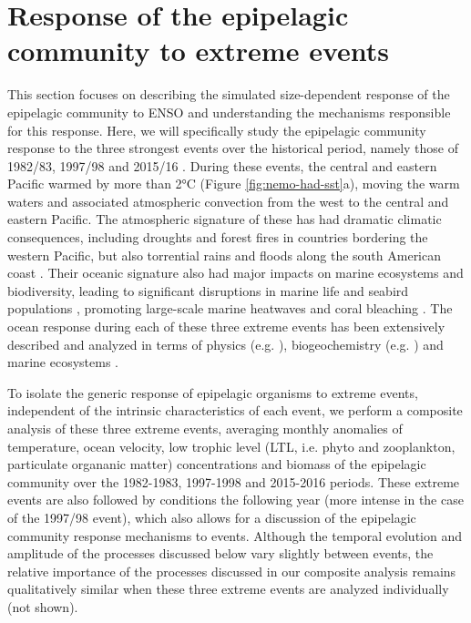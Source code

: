 
\section{Response of the epipelagic community to extreme \nino{} events}
\label{sec:nino-epi}

This section focuses on describing the simulated size-dependent response of the epipelagic community to ENSO and understanding the mechanisms responsible for this response. Here, we will specifically study the epipelagic community response to the three strongest \nino{} events over the historical period, namely those of 1982/83, 1997/98 and 2015/16 \citep{santosoDefiningCharacteristicsENSO2017}. During these events, the central and eastern Pacific warmed by more than 2°C (Figure \ref{fig:nemo-had-sst}a), moving the warm waters and associated atmospheric convection from the west to the central and eastern Pacific. The atmospheric signature of these \nino{} has had dramatic climatic consequences, including droughts and forest fires in countries bordering the western Pacific, but also torrential rains and floods along the south American coast \citep{caiClimateImpactsNino2020}. Their oceanic signature also had major impacts on marine ecosystems and biodiversity, leading to significant disruptions in marine life and seabird populations \citep{valleImpact198219831987}, promoting large-scale marine heatwaves \citep{holbrookKeepingPaceMarine2020} and coral bleaching \citep{claarGlobalPatternsImpacts2018}.  The ocean response during each of these three extreme events has been extensively described and analyzed in terms of physics (e.g. \citealp{philanderChapter33Simulation1985, lengaigneOceanResponseMarch2002, puyModulationEquatorialPacific2019}), biogeochemistry (e.g. \citealp{barberBiologicalConsequencesNino1983, chavezBiologicalChemicalResponse1999, strammaObservedNinoConditions2016}) and marine ecosystems \citep{glynnNINOSOUTHERNOSCILLATION198219831988, glynnCoralBleachingMortality2001, eakin20142017Globalscale2019}. 

To isolate the generic response of epipelagic organisms to extreme \nino{} events, independent of the intrinsic characteristics of each event, we perform a composite analysis of these three extreme events, averaging monthly anomalies of temperature, ocean velocity, low trophic level  (LTL, i.e. phyto and zooplankton, particulate organanic matter) concentrations and biomass of the epipelagic community over the 1982-1983, 1997-1998 and 2015-2016 periods. These extreme \nino{} events are also followed by \nina{} conditions the following year (more intense in the case of the 1997/98 event), which also allows for a discussion  of the epipelagic community response mechanisms to \nina{} events. Although the temporal evolution and amplitude of the processes discussed below vary slightly between events, the relative importance of the processes discussed in our composite analysis remains qualitatively similar when these three extreme events are analyzed individually (not shown). 

